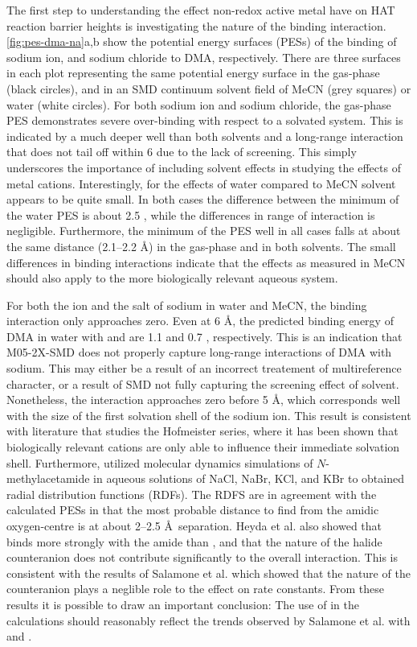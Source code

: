 The first step to understanding the effect non-redox active metal have on HAT
reaction barrier heights is investigating the nature of the binding
interaction. \ref{fig:pes-dma-na}a,b show the potential energy surfaces (PESs)
of the binding of sodium ion, and sodium chloride to DMA, respectively. There
are three surfaces in each plot representing the same potential energy surface
in the gas-phase (black circles), and in an SMD\cite{Marenich2009} continuum
solvent field of MeCN (grey squares) or water (white circles). For both sodium
ion and sodium chloride, the gas-phase PES demonstrates severe over-binding
with respect to a solvated system. This is indicated by a much deeper well than
both solvents and a long-range interaction that does not tail off within 6
\kcalmol due to the lack of screening. This simply underscores the importance
of including solvent effects in studying the effects of metal cations.
Interestingly, for the effects of water compared to MeCN solvent appears to be
quite small. In both cases the difference between the minimum of the water PES
is about 2.5 \kcalmol, while the differences in range of interaction is
negligible. Furthermore, the minimum of the PES well in all cases falls at
about the same distance (2.1--2.2 \AA) in the gas-phase and in both solvents.
The small differences in binding interactions indicate that the effects as
measured in MeCN should also apply to the more biologically relevant aqueous
system. 

For both the ion and the salt of sodium in water and MeCN, the binding
interaction only approaches zero. Even at 6 \AA, the predicted binding energy
of DMA in water with  and  are 1.1 and 0.7 \kcalmol,
respectively. This is an indication that M05-2X-SMD does not properly capture
long-range interactions of DMA with sodium. This may either be a result of an
incorrect treatement of multireference character, or a result of SMD not fully
capturing the screening effect of solvent. Nonetheless, the interaction
approaches zero before 5 \AA, which corresponds well with the size of the first
solvation shell of the sodium ion.\cite{Degreve1996} This result is consistent
with literature that studies the Hofmeister series, where it has been shown
that biologically relevant cations are only able to influence their immediate
solvation shell.\cite{Omta2003, Funkner2011} Furthermore, \citet{Heyda2009}
utilized molecular dynamics simulations of $N$-methylacetamide in aqueous
solutions of NaCl, NaBr, KCl, and KBr to obtained radial distribution functions
(RDFs). The RDFS are in agreement with the calculated PESs in that the most
probable distance to find  from the amidic oxygen-centre is at about
2--2.5 \AA\ separation. Heyda et al. also showed that  binds more
strongly with the amide than , and that the nature of the halide
counteranion does not contribute significantly to the overall interaction. This
is consistent with the results of Salamone et al. which showed that the nature
of the counteranion plays a neglible role to the effect on rate
constants.\cite{Salamone2013a} From these results it is possible to draw an
important conclusion: The use of  in the calculations should
reasonably reflect the trends observed by Salamone et al.  with  and
.

